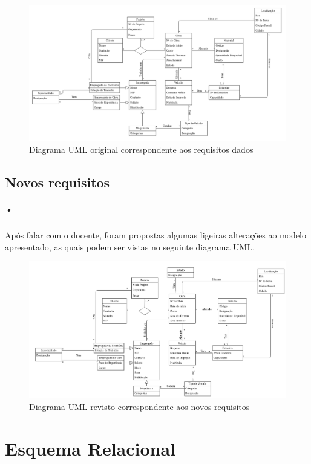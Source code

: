 \documentclass{report}
\begin{document}
			\begin{figure}[hb!]
				\centering
				\includegraphics[scale=0.45, angle=-90]{UML-Original.png}
				\caption{Diagrama UML original correspondente aos requisitos dados}
			\end{figure}
		
		\section{Novos requisitos}
			
			\paragraph{•}Após falar com o docente, foram propostas algumas ligeiras
			alterações ao modelo apresentado, as quais podem ser vistas no seguinte diagrama
			UML.
			
			\begin{figure}[hb!]
				\centering
				\includegraphics[scale=0.44, angle=-90]{UML-Revisto.png}
				\caption{Diagrama UML revisto correspondente aos novos requisitos}
			\end{figure}
	\chapter{Esquema Relacional}
	
\end{document}

